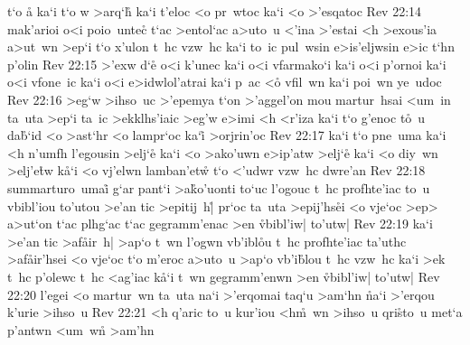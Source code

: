 t`o
\r{a}
ka`i
t`o
w
>arq`h\r{}
ka`i
t'eloc
<o
pr~wtoc
ka`i
<o
>'esqatoc\bibvsend
\vs Rev 22:14
mak'arioi
o<i
poio~untec\r{}
t`ac
>entol`ac
a>uto~u
<'ina
>'estai
<h
>exous'ia
a>ut~wn
>ep`i
t`o
x'ulon
t~hc
vzw~hc
ka`i
to~ic
pul~wsin
e>is'eljwsin
e>ic
t`hn
p'olin\bibvsend
\vs Rev 22:15
>'exw
d`e\r{}
o<i
k'unec
ka`i
o<i
vfarmako`i
ka`i
o<i
p'ornoi
ka`i
o<i
vfone~ic
ka`i
o<i
e>idwlol'atrai
ka`i
p~ac
<o\r{}
vfil~wn
ka`i
poi~wn
ye~udoc\bibvsend
\vs Rev 22:16
>eg`w
>ihso~uc
>'epemya
t`on
>'aggel'on
mou
martur~hsai
<um~in
ta~uta
>ep`i
ta~ic
>ekklhs'iaic
>eg'w
e>imi
<h
<r'iza
ka`i
t`o
g'enoc
t\r{o}~u
da\r{b}`id
<o
>ast`hr
<o
lampr`oc
ka`i\r{}
>orjrin'oc\bibvsend
\vs Rev 22:17
ka`i
t`o
pne~uma
ka`i
<h
n'umfh
l'egousin
>elj`e\r{}
ka`i
<o
>ako'uwn
e>ip'atw
>elj`e\r{}
ka`i
<o
diy~wn
>elj'e\r{t}w
k\r{a}`i
<o
vj'elwn
lamban'etw\r{}
t`o
<'udwr
vzw~hc
dwre'an\bibvsend
\vs Rev 22:18
summarturo~umai\r{}
g`ar
pant`i
>a\r{k}o'uonti
to`uc
l'ogouc
t~hc
profhte'iac
to~u
vbibl'iou
to'utou
>e'an
tic
>epitij~h|\r{}
pr`oc
ta~uta
>epij'hs\r{e}i
<o
vje`oc
>ep>
a>ut`on
t`ac
plhg`ac
t`ac
gegramm'enac
>en
\r{vb}ibl'iw|
to'utw|\bibvsend
\vs Rev 22:19
ka`i
>e'an
tic
>af\r{a}ir~h|
>ap`o
t~wn
l'ogwn
vb'ibl\r{o}u
t~hc
profhte'iac
ta'uthc
>af\r{a}ir'hsei
<o
vje`oc
t`o
m'eroc
a>uto~u
>ap`o
vb'i\r{b}lou
t~hc
vzw~hc
ka`i
>ek
t~hc
p'olewc
t~hc
<ag'iac
k\r{a}`i
t~wn
gegramm'enwn
>en
\r{vb}ibl'iw|
to'utw|\bibvsend
\vs Rev 22:20
l'egei
<o
martur~wn
ta~uta
na`i
>'erqomai
taq`u
>am`hn
\r{n}a`i
>'erqou
k'urie
>ihso~u\bibvsend
\vs Rev 22:21
<h
q'aric
to~u
kur'iou
<h\r{m}~wn
>ihso~u
qri\r{s}to~u
met`a
p'antwn
<um~wn\r{}
>am'hn\bibvsend

